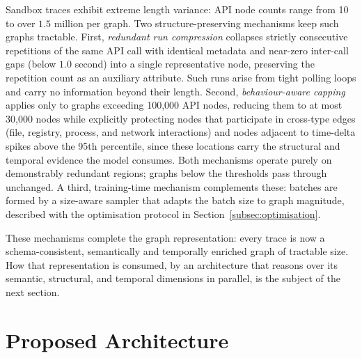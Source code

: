 \documentclass[%
    BCOR=10mm,
    DIV=13,
    toc=bibliography,
    toc=listof,
    oneside,
    12pt,
]{scrbook}
\begin{document}
Sandbox traces exhibit extreme length variance: API node counts range from 10
to over $1.5$ million per graph. Two structure-preserving mechanisms keep such
graphs tractable. First, \emph{redundant run compression} collapses strictly
consecutive repetitions of the same API call with identical metadata and
near-zero inter-call gaps (below $1.0$ second) into a single representative
node, preserving the repetition count as an auxiliary attribute. Such runs
arise from tight polling loops and carry no information beyond their length.
Second, \emph{behaviour-aware capping} applies only to graphs exceeding
100{,}000 API nodes, reducing them to at most 30{,}000 nodes while explicitly
protecting nodes that participate in cross-type edges (file, registry,
process, and network interactions) and nodes adjacent to time-delta spikes
above the 95th percentile, since these locations carry the structural and
temporal evidence the model consumes. Both mechanisms operate purely on
demonstrably redundant regions; graphs below the thresholds pass through
unchanged. A third, training-time mechanism complements these: batches are
formed by a size-aware sampler that adapts the batch size to graph magnitude,
described with the optimisation protocol in
Section~\ref{subsec:optimisation}.

These mechanisms complete the graph representation: every trace is now a
schema-consistent, semantically and temporally enriched graph of tractable size.
How that representation is consumed, by an architecture that reasons over its
semantic, structural, and temporal dimensions in parallel, is the subject of the
next section.

\section{Proposed Architecture}
\label{sec:architecture}
\end{document}
